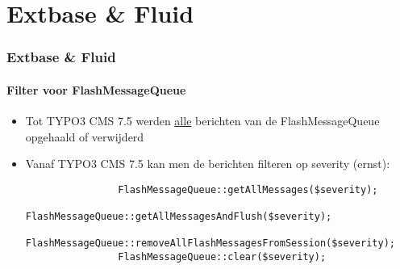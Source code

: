 %

\section{Extbase \& Fluid}


\begin{frame}[fragile]
	\frametitle{Extbase \& Fluid}
	\framesubtitle{Filter voor FlashMessageQueue}

	\begin{itemize}

		\item Tot TYPO3 CMS 7.5 werden \underline{alle} berichten van de 
			FlashMessageQueue opgehaald of verwijderd

		\item Vanaf TYPO3 CMS 7.5 kan men de berichten filteren op severity (ernst):

			\begin{lstlisting}
				FlashMessageQueue::getAllMessages($severity);
				FlashMessageQueue::getAllMessagesAndFlush($severity);
				FlashMessageQueue::removeAllFlashMessagesFromSession($severity);
				FlashMessageQueue::clear($severity);
			\end{lstlisting}

	\end{itemize}

\end{frame}


